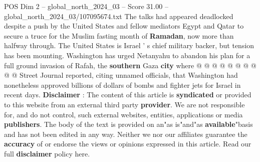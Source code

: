 \begin{textsample}{POS Dim 2 – global\_north\_2024\_03 – Score 31.00 – global\_north\_2024\_03/107095674.txt}
The talks had appeared deadlocked despite a push by the United States and fellow mediators Egypt and Qatar to secure a truce for the Muslim fasting month of \textbf{Ramadan}, now more than halfway through.
The United States is Israel ' s chief military backer, but tension has been mounting.
Washington has urged Netanyahu to abandon his plan for a full ground invasion of Rafah, the \textbf{southern} Gaza \textbf{city} where @ @ @ @ @ @ @ @ @ @ Street Journal reported, citing unnamed officials, that Washington had nonetheless approved billions of dollars of bombs and fighter jets for Israel in recent days. \textbf{Disclaimer} : The content of this article is \textbf{syndicated} or provided to this website from an external third party \textbf{provider}.
We are not responsible for, and do not control, such external websites, entities, applications or media \textbf{publishers}.
The body of the text is provided on an"as is"and"as \textbf{available}"basis and has not been edited in any way.
Neither we nor our affiliates guarantee the \textbf{accuracy} of or endorse the views or opinions expressed in this article.
Read our full \textbf{disclaimer} policy here.

\end{textsample}
